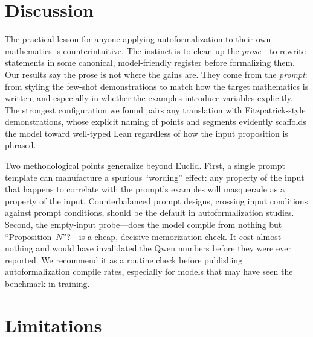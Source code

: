 \documentclass[11pt]{article}
\begin{document}
\section{Discussion}

The practical lesson for anyone applying autoformalization to their own
mathematics is counterintuitive. The instinct is to clean up the
\emph{prose}---to rewrite statements in some canonical, model-friendly register
before formalizing them. Our results say the prose is not where the gains are.
They come from the \emph{prompt}: from styling the few-shot demonstrations to
match how the target mathematics is written, and especially in whether the
examples introduce variables explicitly. The strongest configuration we found
pairs any translation with Fitzpatrick-style demonstrations, whose explicit
naming of points and segments evidently scaffolds the model toward well-typed
Lean regardless of how the input proposition is phrased.

Two methodological points generalize beyond Euclid. First, a single prompt
template can manufacture a spurious ``wording'' effect: any property of the input
that happens to correlate with the prompt's examples will masquerade as a
property of the input. Counterbalanced prompt designs, crossing input conditions
against prompt conditions, should be the default in autoformalization studies.
Second, the empty-input probe---does the model compile from nothing but
``Proposition~$N$''?---is a cheap, decisive memorization check. It cost almost
nothing and would have invalidated the Qwen numbers before they were ever
reported. We recommend it as a routine check before publishing autoformalization
compile rates, especially for models that may have seen the benchmark in
training.

\section{Limitations}
\label{sec:limits}
\end{document}
